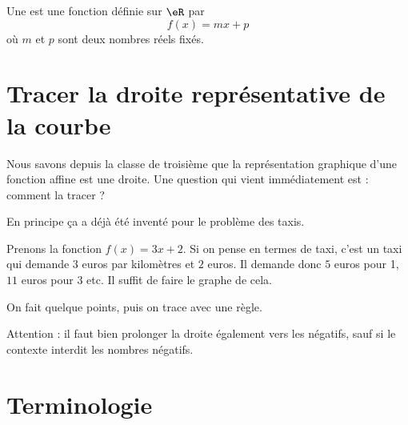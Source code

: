 \begin{definition}
    Une  est une fonction définie sur \( \eR\) par
    \begin{equation}
        f(x)=mx+p
    \end{equation}
    où \( m\) et \( p\) sont deux nombres réels fixés.
\end{definition}

\section{Tracer la droite représentative de la courbe}

Nous savons depuis la classe de troisième que la représentation graphique d'une fonction affine est une droite. Une question qui vient immédiatement est : comment la tracer ?

En principe ça a déjà été inventé pour le problème des taxis.


\begin{example}
    \begin{wrapfigure}[20]{r}{7.0cm}
   \vspace{-0.5cm}        %
   \centering
   
\end{wrapfigure}

    Prenons la fonction \( f(x)=3x+2\). Si on pense en termes de taxi, c'est un taxi qui demande \( 3\) euros par kilomètres et \( 2\) euros. Il demande donc \( 5\) euros pour \unit{1}{\kilo\meter}, \( 11\) euros pour \unit{3}{\kilo\meter} etc. Il suffit de faire le graphe de cela. 


    On fait quelque points, puis on trace avec une règle.

    Attention : il faut bien prolonger la droite également vers les négatifs, sauf si le contexte interdit les nombres négatifs.
    
\end{example}

\section{Terminologie}

